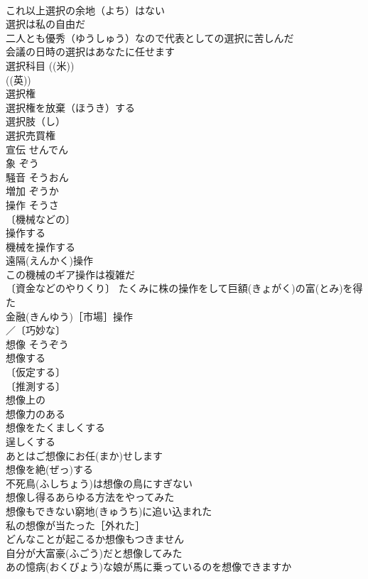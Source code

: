\documentclass[8pt]{extreport}
\begin{document}
\begin{CJK}{UTF8}{min}
\\	これ以上選択の余地（よち）はない 
\\	選択は私の自由だ 
\\	二人とも優秀（ゆうしゅう）なので代表としての選択に苦しんだ 
\\	会議の日時の選択はあなたに任せます 
\\	選択科目 ((米)) 
\\	((英)) 
\\	選択権 
\\	選択権を放棄（ほうき）する 
\\	選択肢（し） 
\\	選択売買権 
\\	宣伝	せんでん	
\\	象	ぞう	
\\	騒音	そうおん	
\\	増加	ぞうか	
\\	操作	そうさ	
\\	〔機械などの〕
\\	操作する 
\\	機械を操作する 
\\	遠隔(えんかく)操作 
\\	この機械のギア操作は複雑だ 
\\	〔資金などのやりくり〕 たくみに株の操作をして巨額(きょがく)の富(とみ)を得た 
\\	金融(きんゆう)［市場］操作 
\\	／〔巧妙な〕
\\	想像	そうぞう	
\\	想像する 
\\	〔仮定する〕
\\	〔推測する〕
\\	想像上の 
\\	想像力のある 
\\	想像をたくましくする 
\\	逞しくする 
\\	あとはご想像にお任(まか)せします 
\\	想像を絶(ぜっ)する 
\\	不死鳥(ふしちょう)は想像の鳥にすぎない 
\\	想像し得るあらゆる方法をやってみた 
\\	想像もできない窮地(きゅうち)に追い込まれた 
\\	私の想像が当たった［外れた］ 
\\	どんなことが起こるか想像もつきません 
\\	自分が大富豪(ふごう)だと想像してみた 
\\	あの憶病(おくびょう)な娘が馬に乗っているのを想像できますか 

\end{CJK}
\end{document}
